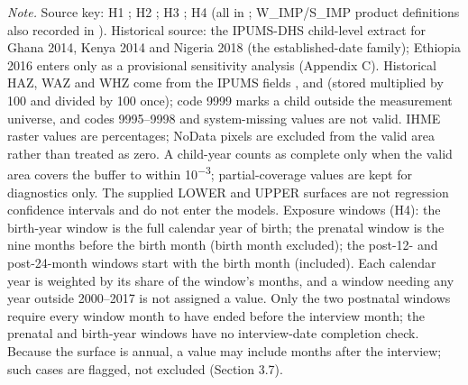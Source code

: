 \begin{ThesisTableNote}

\emph{Note.} Source key: H1 ; H2 ; H3 ; H4  (all in ; W\_IMP/S\_IMP product definitions also recorded in ). Historical source: the IPUMS-DHS child-level extract for Ghana 2014, Kenya 2014 and Nigeria 2018 (the established-date family); Ethiopia 2016 enters only as a provisional sensitivity analysis (Appendix C). Historical HAZ, WAZ and WHZ come from the IPUMS fields ,  and  (stored multiplied by 100 and divided by 100 once); code 9999 marks a child outside the measurement universe, and codes 9995--9998 and system-missing values are not valid. IHME raster values are percentages; NoData pixels are excluded from the valid area rather than treated as zero. A child-year counts as complete only when the valid area covers the buffer to within 10\textsuperscript{−3}; partial-coverage values are kept for diagnostics only. The supplied LOWER and UPPER surfaces are not regression confidence intervals and do not enter the models. Exposure windows (H4): the birth-year window is the full calendar year of birth; the prenatal window is the nine months before the birth month (birth month excluded); the post-12- and post-24-month windows start with the birth month (included). Each calendar year is weighted by its share of the window's months, and a window needing any year outside 2000--2017 is not assigned a value. Only the two postnatal windows require every window month to have ended before the interview month; the prenatal and birth-year windows have no interview-date completion check. Because the surface is annual, a value may include months after the interview; such cases are flagged, not excluded (Section 3.7).

\end{ThesisTableNote}

